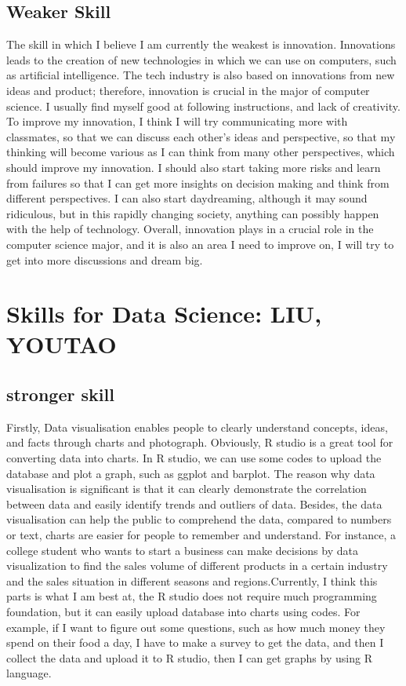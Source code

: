 \documentclass[a4paper, 11pt]{report}
\begin{document}
\subsection{Weaker Skill}	
	The skill in which I believe I am currently the weakest is innovation. Innovations leads to the creation of new technologies in which we can use on computers, such as artificial intelligence. The tech industry is also based on innovations from new ideas and product; therefore, innovation is crucial in the major of computer science. I usually find myself good at following instructions, and lack of creativity. To improve my innovation, I think I will try communicating more with classmates, so that we can discuss each other’s ideas and perspective, so that my thinking will become various as I can think from many other perspectives, which should improve my innovation. I should also start taking more risks and learn from failures so that I can get more insights on decision making and think from different perspectives. I can also start daydreaming, although it may sound ridiculous, but in this rapidly changing society, anything can possibly happen with the help of technology. Overall, innovation plays in a crucial role in the computer science major, and it is also an area I need to improve on, I will try to get into more discussions and dream big.





\section{Skills for Data Science: LIU, YOUTAO}
\subsection{stronger skill}
	Firstly, Data visualisation enables people to clearly understand concepts, ideas, and facts through charts and photograph. Obviously, R studio is a great tool for converting data into charts. In R studio, we can use some codes to upload the database and plot a graph, such as ggplot and barplot. The reason why data visualisation is significant is that it can clearly demonstrate the correlation between data and easily identify trends and outliers of data. Besides, the data visualisation can help the public to comprehend the data, compared to numbers or text, charts are easier for people to remember and understand. For instance, a college student who wants to start a business can make decisions by data visualization to find the sales volume of different products in a certain industry and the sales situation in different seasons and regions.Currently, I think this parts is what I am best at, the R studio does not require much programming foundation, but it can easily upload database into charts using codes. For example, if I want to figure out some questions, such as how much money they spend on their food a day, I have to make a survey to get the data, and then I collect the data and upload it to R studio, then I can get graphs by using R language.
\end{document}
